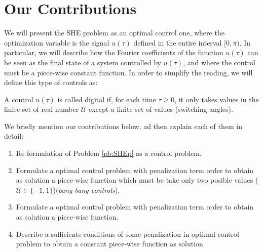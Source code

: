 \section{Our Contributions}\label{sec:Contributions}

We will present the SHE problem as an optimal control one, where the optimization variable is the signal $u(\tau)$ defined in the entire interval $[0,\pi)$. 
%
In particular, we will describe how the Fourier coefficients of the function $u(\tau)$ can be seen as the final state of a system controlled by $u (\tau)$, and where the control must be a piece-wise constant function. In order to simplify the reading, we will define this type of controls as:

\vspace{1em}
\begin{definition}
    A control $u(\tau)$ is called digital if, for each time $\tau\geq 0$, it only takes values in the finite set of real number $\mathcal{U}$ except a finite set of values (switching angles).  
\end{definition}
%
%
%
%
%
%
%
We briefly mention our contributions below, ad then explain each of them in detail:
\begin{enumerate}
    \item Re-formulation of Problem \ref{pb:SHEp} as a control problem.
    \item Formulate a optimal control problem with penalization term order to obtain as solution a piece-wise  function which must be take only two posible values ($\mathcal{U} \in \{-1,1\}$)(\emph{bang-bang controls}).
    \item Formulate a optimal control problem with penalization term order to obtain as solution a piece-wise function.
    \item Describe a sufficients conditions of some penalization in optimal control problem to obtain a constant piece-wise function as solution
\end{enumerate}

